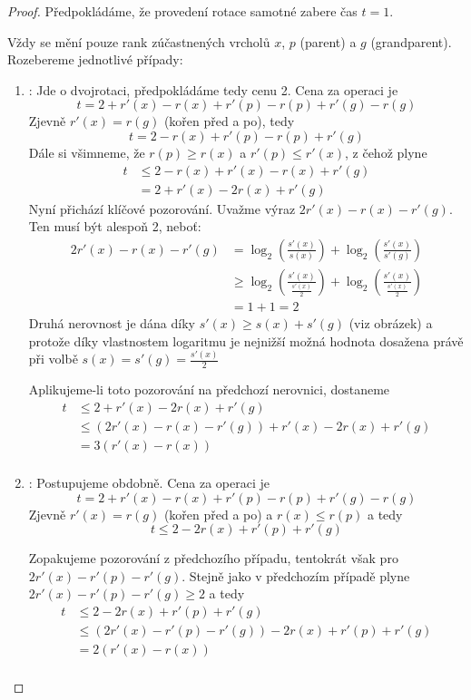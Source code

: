 \documentclass[11pt]{report} %
\numberwithin{equation}{section}
\begin{document}
\begin{proof}
Předpokládáme, že provedení rotace samotné zabere čas $t = 1$. 

Vždy se mění pouze rank zúčastnených vrcholů $x$, $p$ (parent) a $g$ (grandparent). Rozebereme jednotlivé případy:
\begin{enumerate}
	\item \textbf{}:
	 Jde o dvojrotaci, předpokládáme tedy cenu 2. Cena za operaci je
	 $$t = 2 + r'(x) - r(x) + r'(p) - r(p) + r'(g) - r(g)$$
	 Zjevně $r'(x) = r(g)$ (kořen před a po), tedy
 	 $$t = 2 - r(x) + r'(p) - r(p) + r'(g)$$
 	 Dále si všimneme, že $r(p) \geq r(x)$ a $r'(p) \leq r'(x)$, z čehož plyne
 	 \begin{align*}
	 	t 	&\leq 2 - r(x) + r'(x) - r(x) + r'(g)\\
	 		&= 2 + r'(x) - 2r(x) + r'(g)
 	 \end{align*}
	Nyní přichází klíčové pozorování. Uvažme výraz $2r'(x) - r(x) - r'(g)$. Ten musí být alespoň 2, neboť: 	 
	\begin{align*}
		2r'(x) - r(x) - r'(g) &= \log_2\left(\frac{s'(x)}{s(x)}\right) + \log_2\left(\frac{s'(x)}{s'(g)}\right)\\
							  &\geq \log_2\left(\frac{s'(x)}{\frac{s'(x)}{2}}\right) + \log_2\left(\frac{s'(x)}{\frac{s'(x)}{2}}\right)\\
							  & = 1 + 1 = 2
	\end{align*}
	Druhá nerovnost je dána díky $s'(x) \geq s(x) + s'(g)$ (viz obrázek) a protože díky vlastnostem logaritmu je nejnižší možná hodnota dosažena právě při volbě $s(x) = s'(g) = \frac{s'(x)}{2}$ %

	Aplikujeme-li toto pozorování na předchozí nerovnici, dostaneme	
    \begin{align*}
	t 	&\leq 2 + r'(x) - 2r(x) + r'(g) \\
		&\leq (2r'(x) - r(x) - r'(g)) + r'(x) - 2r(x) + r'(g) \\
		&= 3(r'(x) - r(x)) \\
	\end{align*}
	
	\item \textbf{}:
	Postupujeme obdobně. Cena za operaci je 
	$$t = 2 + r'(x) - r(x) + r'(p) - r(p) + r'(g) - r(g)$$
	Zjevně $r'(x) = r(g)$ (kořen před a po) a $r(x) \leq r(p)$ a tedy
	$$t \leq 2 - 2r(x) + r'(p) + r'(g)$$
	
	Zopakujeme pozorování z předchozího případu, tentokrát však pro	$2r'(x) - r'(p) - r'(g)$. Stejně jako v předchozím případě plyne $2r'(x) - r'(p) - r'(g) \geq 2$ a tedy
	\begin{align*}
	t 	&\leq 2 - 2r(x) + r'(p) + r'(g) \\
		&\leq (2r'(x) - r'(p) - r'(g)) - 2r(x) + r'(p) + r'(g) \\
		&= 2(r'(x) - r(x)) \\
	\end{align*}
		

\end{enumerate}
\end{proof}
\end{document}
